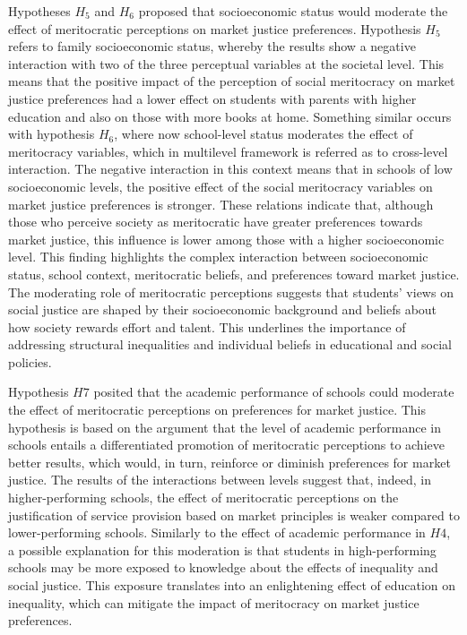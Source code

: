 \documentclass[
  12pt,
  letterpaper,
]{article}
\begin{document}
Hypotheses \(H_5\) and \(H_6\) proposed that socioeconomic status would
moderate the effect of meritocratic perceptions on market justice
preferences. Hypothesis \(H_5\) refers to family socioeconomic status,
whereby the results show a negative interaction with two of the three
perceptual variables at the societal level. This means that the positive
impact of the perception of social meritocracy on market justice
preferences had a lower effect on students with parents with higher
education and also on those with more books at home. Something similar
occurs with hypothesis \(H_6\), where now school-level status moderates
the effect of meritocracy variables, which in multilevel framework is
referred as to cross-level interaction. The negative interaction in this
context means that in schools of low socioeconomic levels, the positive
effect of the social meritocracy variables on market justice preferences
is stronger. These relations indicate that, although those who perceive
society as meritocratic have greater preferences towards market justice,
this influence is lower among those with a higher socioeconomic level.
This finding highlights the complex interaction between socioeconomic
status, school context, meritocratic beliefs, and preferences toward
market justice. The moderating role of meritocratic perceptions suggests
that students' views on social justice are shaped by their socioeconomic
background and beliefs about how society rewards effort and talent. This
underlines the importance of addressing structural inequalities and
individual beliefs in educational and social policies.

Hypothesis \(H7\) posited that the academic performance of schools could
moderate the effect of meritocratic perceptions on preferences for
market justice. This hypothesis is based on the argument that the level
of academic performance in schools entails a differentiated promotion of
meritocratic perceptions to achieve better results, which would, in
turn, reinforce or diminish preferences for market justice. The results
of the interactions between levels suggest that, indeed, in
higher-performing schools, the effect of meritocratic perceptions on the
justification of service provision based on market principles is weaker
compared to lower-performing schools. Similarly to the effect of
academic performance in \(H4\), a possible explanation for this
moderation is that students in high-performing schools may be more
exposed to knowledge about the effects of inequality and social justice.
This exposure translates into an enlightening effect of education on
inequality, which can mitigate the impact of meritocracy on market
justice preferences.
\end{document}
